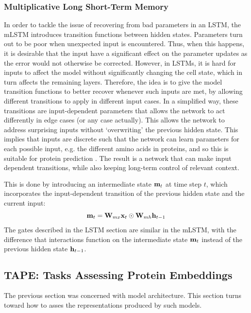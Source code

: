 \documentclass[a4paper,12pt]{article}
\begin{document}
\subsubsection{Multiplicative Long Short-Term Memory}
\label{section:mlstm}
In order to tackle the issue of recovering from bad parameters in an LSTM, the mLSTM introduces transition functions between hidden states. Parameters turn out to be poor when unexpected input is encountered. Thus, when this happens, it is desirable that the input have a significant effect on the parameter updates as the error would not otherwise be corrected. However, in LSTMs, it is hard for inputs to affect the model without significantly changing the cell state, which in turn affects the remaining layers. Therefore, the idea is to give the model transition functions to better recover whenever such inputs are met, by allowing different transitions to apply in different input cases. In a simplified way, these transitions are input-dependent parameters that allows the network to act differently in edge cases (or any case actually). This allows the network to address surprising inputs without `overwriting' the previous hidden state. This implies that inputs are discrete such that the network can learn parameters for each possible input, e.g. the different amino acids in proteins, and so this is suitable for protein prediction \cite{krause2016multiplicative}. The result is a network that can make input dependent transitions, while also keeping long-term control of relevant context.

This is done by introducing an intermediate state $\mathbf{ m }_t$ at time step $t$, which incorporates the input-dependent transition of the previous hidden state and the current input:
\[ \mathbf{ m }_t = \mathbf{ W }_{mx} \mathbf{ x }_t \odot \mathbf{ W }_{mh} \mathbf{ h }_{t-1}\]
The gates described in the LSTM section are similar in the mLSTM, with the difference that interactions function on the intermediate state $\mathbf{ m }_t$ instead of the previous hidden state $\mathbf{ h }_{t-1}$. 


\subsection{TAPE: Tasks Assessing Protein Embeddings}
\label{section:tape}
The previous section was concerned with model architecture. This section turns toward how to asses the representations produced by such models. 
\end{document}
